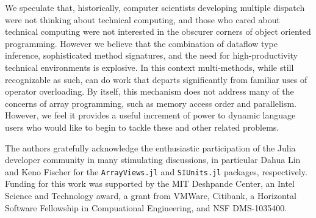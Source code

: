 \documentclass[preprint]{sigplanconf}
\newcommand{\code}[1]{\texttt{#1}}
\begin{document}
We speculate that, historically, computer scientists developing multiple dispatch
were not thinking about technical computing, and those who cared about
technical computing were not interested in the obscurer corners of object oriented
programming. However we believe that the combination of dataflow type inference,
sophisticated method signatures, and the need for high-productivity technical
environments is explosive. In this context multi-methods, while still
recognizable as such, can do work that departs significantly from familiar
uses of operator overloading. By itself, this mechanism does not address
many of the concerns of array programming, such as memory access order
and parallelism. However, we feel it provides a useful increment of power
to dynamic language users who would like to begin to tackle these and other
related problems.


%

\acks

The authors gratefully acknowledge the enthusiastic participation of the Julia
developer community in many stimulating discussions, in particular Dahua Lin and
Keno Fischer for the \code{ArrayViews.jl}\cite{Lin:2014av} and
\code{SIUnits.jl}\cite{Fischer:2014si} packages, respectively. Funding for this
work was supported by the MIT Deshpande Center, an Intel Science and
Technology award, a grant from VMWare, Citibank, a Horizontal Software
Fellowship in Compuational Engineering, and NSF DMS-1035400.


{}





\end{document}
